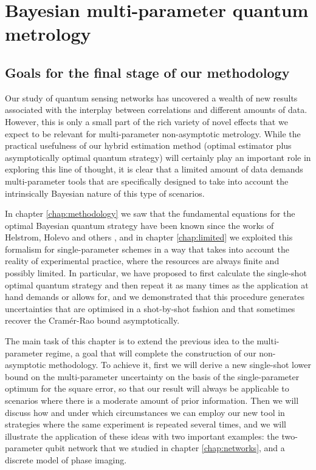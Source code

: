 \chapter{Bayesian multi-parameter quantum metrology}
\label{chap:multibayes}

\section{Goals for the final stage of our methodology}

Our study of quantum sensing networks has uncovered a wealth of new results associated with the interplay between correlations and different amounts of data. However, this is only a small part of the rich variety of novel effects that we expect to be relevant for multi-parameter non-asymptotic metrology. While the practical usefulness of our hybrid estimation method (optimal estimator plus asymptotically optimal quantum strategy) will certainly play an important role in exploring this line of thought, it is clear that a limited amount of data demands multi-parameter tools that are specifically designed to take into account the intrinsically Bayesian nature of this type of scenarios.  

In chapter \ref{chap:methodology} we saw that the fundamental equations for the optimal Bayesian quantum strategy have been known since the works of Helstrom, Holevo and others \cite{personick1971, helstrom1976, helstrom1974, holevo1973b, holevo1973, yuen1973}, and in chapter \ref{chap:limited} we exploited this formalism for single-parameter schemes in a way that takes into account the reality of experimental practice, where the resources are always finite and possibly limited. In particular, we have proposed to first calculate the single-shot optimal quantum strategy and then repeat it as many times as the application at hand demands or allows for, and we demonstrated that this procedure generates uncertainties that are optimised in a shot-by-shot fashion and that sometimes recover the Cram\'{e}r-Rao bound asymptotically.

The main task of this chapter is to extend the previous idea to the multi-parameter regime, a goal that will complete the construction of our non-asymptotic methodology. To achieve it, first we will derive a new single-shot lower bound on the multi-parameter uncertainty on the basis of the single-parameter optimum for the square error, so that our result will always be applicable to scenarios where there is a moderate amount of prior information. Then we will discuss how and under which circumstances we can employ our new tool in strategies where the same experiment is repeated several times, and we will illustrate the application of these ideas with two important examples: the two-parameter qubit network that we studied in chapter \ref{chap:networks}, and a discrete model of phase imaging. 

